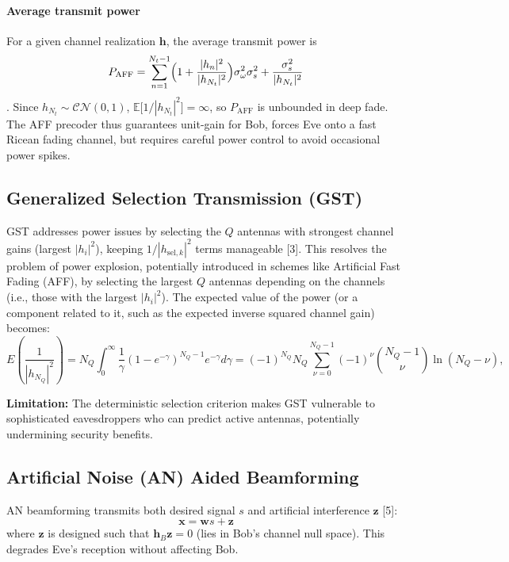 \documentclass[10pt,a4paper]{article} %
\begin{document}
\paragraph{Average transmit power}
For a given channel realization $\mathbf{h}$, the average transmit power is
\begin{equation}
P_{\text{AFF}}=\sum_{n=1}^{N_t-1}\Bigl(1+\frac{|h_{n}|^{2}}{|h_{N_t}|^{2}}\Bigr)\sigma_\omega^{2}\sigma_s^{2}+\frac{\sigma_s^{2}}{|h_{N_t}|^{2}}
\end{equation}.
Since $h_{N_t}\!\sim\!\mathcal{CN}(0,1)$, $\mathbb{E}\!\bigl[1/|h_{N_t}|^{2}\bigr]=\infty$, so $P_{\text{AFF}}$ is unbounded in deep fade.
\medskip
The AFF precoder thus guarantees unit-gain for Bob, forces Eve onto a fast Ricean fading channel, but requires careful power control to avoid occasional power spikes.

\subsection{Generalized Selection Transmission (GST)}

GST addresses power issues by selecting the $Q$ antennas with strongest channel gains (largest $|h_i|^2$), keeping $1/|h_{\text{sel}, k}|^2$ terms manageable [3]. This resolves the problem of power explosion, potentially introduced in schemes like Artificial Fast Fading (AFF), by selecting the largest $Q$ antennas depending on the channels (i.e., those with the largest $|h_i|^2$). The expected value of the power (or a component related to it, such as the expected inverse squared channel gain) becomes:
\begin{equation}
E \left( \frac{1}{|h_{N_Q}|^2} \right) = N_Q \int_0^\infty \frac{1}{\gamma} (1 - e^{-\gamma})^{N_Q-1} e^{-\gamma} d\gamma
= (-1)^{N_Q} N_Q \sum_{\nu=0}^{N_Q-1} (-1)^\nu \binom{N_Q-1}{\nu} \ln(N_Q - \nu),
\end{equation}

\textbf{Limitation:} The deterministic selection criterion makes GST vulnerable to sophisticated eavesdroppers who can predict active antennas, potentially undermining security benefits.
\subsection{Artificial Noise (AN) Aided Beamforming}

AN beamforming transmits both desired signal $s$ and artificial interference $\mathbf{z}$ [5]:
\begin{equation}
    \mathbf{x} = \mathbf{w}s + \mathbf{z}
\end{equation}
where $\mathbf{z}$ is designed such that $\mathbf{h}_B \mathbf{z} = 0$ (lies in Bob's channel null space). This degrades Eve's reception without affecting Bob.
\end{document}
